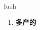 
\begin{frame}
{\huge lush}
\begin{center}
\begin{enumerate}\Large
  \item \textbf{多产的}
\end{enumerate}
\end{center}
\end{frame}
